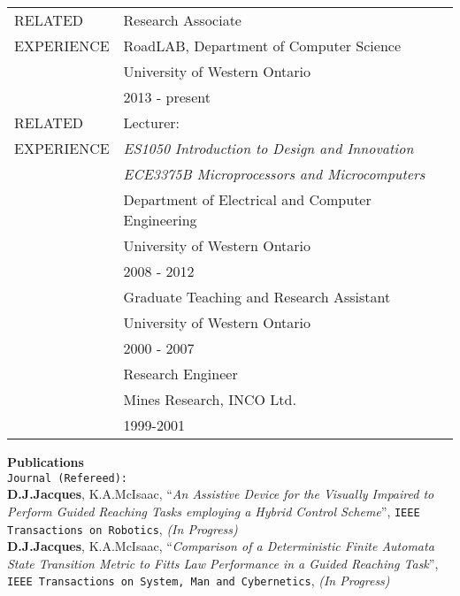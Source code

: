 \begin{center}
\begin{tabular}{p{4.2cm}p{10.5cm}}
RELATED     & Research Associate\\
EXPERIENCE  & RoadLAB, Department of Computer Science\\
            & University of Western Ontario\\
            & 2013 - present\\[1.66ex]

RELATED     & Lecturer: \\
EXPERIENCE  & \textit{ES1050 Introduction to Design and Innovation}\\
            & \textit{ECE3375B Microprocessors and Microcomputers}\\
            & Department of Electrical and Computer Engineering\\
            & University of Western Ontario\\
            & 2008 - 2012 \\[1.66ex]

            & Graduate Teaching and Research Assistant\\
            & University of Western Ontario\\
            & 2000 - 2007\\[1.66ex]

            & Research Engineer \\
            & Mines Research, INCO Ltd.\\
            & 1999-2001 \\
\end{tabular}
\end{center}

\textbf{\Large Publications}\\[2.66ex]

\texttt{\large Journal (Refereed):}\\[1.66ex]
\textbf{D.J.Jacques}, K.A.McIsaac, ``\textit{An Assistive Device for the Visually Impaired to Perform Guided Reaching Tasks employing a Hybrid Control Scheme}'', \texttt{IEEE Transactions on Robotics}, \textsl{(In Progress)}\\[1.66ex]

\textbf{D.J.Jacques}, K.A.McIsaac, ``\textit{Comparison of a Deterministic Finite Automata State Transition Metric to Fitts Law Performance in a Guided Reaching Task}'', \texttt{IEEE Transactions on System, Man and Cybernetics}, \textsl{(In Progress)}\\[1.66ex]

